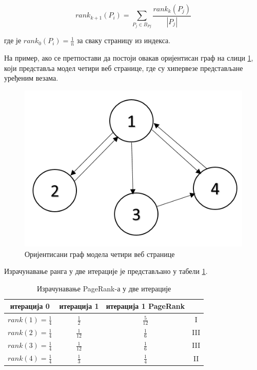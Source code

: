\begin{equation}\label{eq:rank2}
rank_{k+1}(P_{i})=\sum_{P_{j}\in B_{P{j}}}\frac{rank_{k}(P_{j})}{\left |P_{j}  \right |}
\end{equation}

где је $rank_{0}(P_{i})=\frac{1}{n}$ за сваку страницу из индекса.

На пример, ако се претпостави да постоји овакав оријентисан граф на слици \ref{slike:graf}, који представља модел четири веб странице, где су хипервезе представљане уређеним везама.

\begin{figure}[here]
\centering
\includegraphics[scale=0.6]{graf.png}
\caption{Оријентисани граф модела четири веб странице}
\label{slike:graf}
\end{figure}

Израчунавање ранга у две итерације је представљано у табели \ref{tabele:rank}.

\begin{table}[h]
\centering
\def\arraystretch{1.5}
\begin{tabular}{|c|c|c|c|}\hline
\textbf{итерација 0} & \textbf{итерација 1} & \textbf{итерација 1} \textbf{PageRank}\\ \hline\hline
$rank(1)=\frac{1}{4}$ & $\frac{1}{2}$ & $\frac{5}{12}$ & \textrm{I} \\ \hline
$rank(2)=\frac{1}{4}$ & $\frac{1}{12}$ & $\frac{1}{6}$ & \textrm{III} \\ \hline
$rank(3)=\frac{1}{4}$ & $\frac{1}{12}$ & $\frac{1}{6}$ & \textrm{III} \\ \hline
$rank(4)=\frac{1}{4}$ & $\frac{1}{3}$ & $\frac{1}{4}$ &  \textrm{II}\\ \hline
\end{tabular}
\caption{Израчунавање PageRank-а у две итерације}
\label{tabele:rank}
\end{table}


